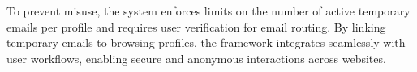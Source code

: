 \documentclass[conference]{IEEEtran}
\begin{document}
To prevent misuse, the system enforces limits on the number of active temporary emails per profile and requires user verification for email routing. By linking temporary emails to browsing profiles, the framework integrates seamlessly with user workflows, enabling secure and anonymous interactions across websites.


















\end{document}
